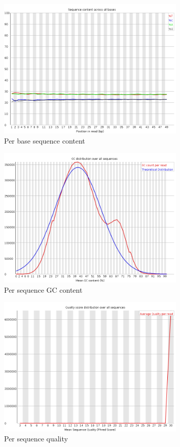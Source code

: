 \documentclass[UTF8]{ctexart}
\begin{document}
\begin{figure}[!htb]
	\centering
	\includegraphics[width=0.8\textwidth]{img/SRR14325859_FastQC_Origin_img/per_base_sequence_content.png}	
	\caption{Per base sequence content\protect}    
\end{figure}

\begin{figure}[!htb]
	\centering
	\includegraphics[width=0.8\textwidth]{img/SRR14325859_FastQC_Origin_img/per_sequence_gc_content.png}	
	\caption{Per sequence GC content\protect}    
\end{figure}

\begin{figure}[!htb]
	\centering
	\includegraphics[width=0.8\textwidth]{img/SRR14325859_FastQC_Origin_img/per_sequence_quality.png}	
	\caption{Per sequence quality\protect}    
\end{figure}
\end{document}
